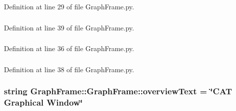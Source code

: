 Definition at line 29 of file GraphFrame.py.\hypertarget{classGraphFrame_1_1GraphFrame_aa3b3a37faec7ba92df01da7122467527}{
\subsubsection[{figs}]{}}
\label{classGraphFrame_1_1GraphFrame_aa3b3a37faec7ba92df01da7122467527}


Definition at line 39 of file GraphFrame.py.\hypertarget{classGraphFrame_1_1GraphFrame_a782a5936f03897f8c55fb5ff9acdded9}{
\subsubsection[{notebook}]{}}
\label{classGraphFrame_1_1GraphFrame_a782a5936f03897f8c55fb5ff9acdded9}


Definition at line 36 of file GraphFrame.py.\hypertarget{classGraphFrame_1_1GraphFrame_a8e4ab824252d2f2078663d88f50f0dbb}{
\subsubsection[{objs}]{}}
\label{classGraphFrame_1_1GraphFrame_a8e4ab824252d2f2078663d88f50f0dbb}


Definition at line 38 of file GraphFrame.py.\hypertarget{classGraphFrame_1_1GraphFrame_a0c76bd981289f7092b052d73a664184f}{
\subsubsection[{overviewText}]{\setlength{\rightskip}{0pt plus 5cm}string {\bf GraphFrame::GraphFrame::overviewText} = \char`\"{}CAT Graphical Window\char`\"{}}}
\label{classGraphFrame_1_1GraphFrame_a0c76bd981289f7092b052d73a664184f}


